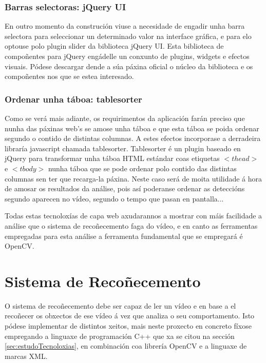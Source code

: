         \subsubsection{Barras selectoras: jQuery UI}
        
            En outro momento da construción viuse a necesidade de engadir unha barra selectora para
            seleccionar un determinado valor na interface gráfica, e para elo optouse polo plugin 
            slider\cite{ComponenteSliderJqueryUi} da biblioteca jQuery UI. Esta biblioteca de 
            compoñentes para jQuery engádelle un conxunto de plugins, widgets e efectos visuais.
            Pódese descargar dende a súa páxina oficial o núcleo da biblioteca e os compoñentes 
            nos que se estea interesado.
        
        \subsubsection{Ordenar unha táboa: tablesorter}
        
            Como se verá mais adiante, os requirimentos da aplicación farán preciso que nunha das
            páxinas web's se amose unha táboa e que esta táboa se poida ordenar segundo o contido de
            distintas columnas. A estes efectos incorporase a derradeira libraría javascript chamada
            tablesorter\cite{tablesorter-webPage}. Tablesorter é un plugin baseado en jQuery para transformar 
            unha táboa HTML estándar coas etiquetas $<thead>$ e $<tbody>$ nunha táboa que se pode 
            ordenar polo contido das distintas columnas sen ter que recarga-la páxina. Neste
            caso será de moita utilidade á hora de amosar os resultados da análise, pois así 
            poderanse ordenar as deteccións segundo aparecen no vídeo, segundo o tempo que pasan 
            en pantalla... 
        
    Todas estas tecnoloxías de capa web axudarannos a mostrar con máis facilidade a análise que o
    sistema de recoñecemento faga do vídeo, e en canto as ferramentas empregadas para esta análise
    a ferramenta fundamental que se empregará é OpenCV.
    
\section{Sistema de Recoñecemento}
    O sistema de recoñecemento debe ser capaz de ler un vídeo e en base a el recoñecer os obxectos
    de ese vídeo á vez que analiza o seu comportamento. Isto pódese implementar de distintos xeitos,
    mais neste proxecto en concreto fíxose empregando a linguaxe de programación C++ que xa se citou
    na sección \ref{sec:estudoTecnoloxias}, en combinación coa librería OpenCV e a linguaxe de marcas
    XML.

